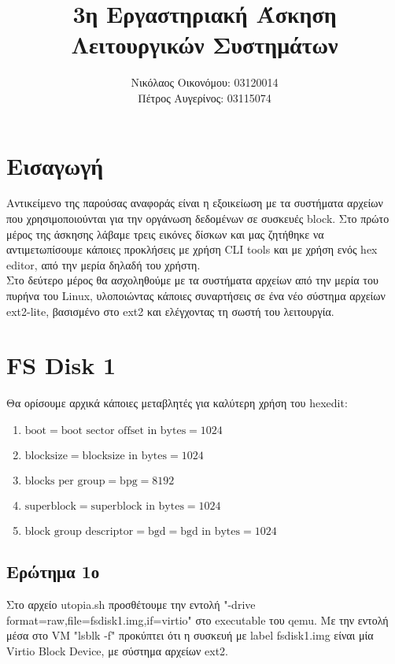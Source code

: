 \documentclass{article}
\title{3η Εργαστηριακή Άσκηση Λειτουργικών Συστημάτων}
\author{Νικόλαος Οικονόμου: 03120014 \\
        Πέτρος Αυγερίνος: 03115074}
\date{}
\begin{document}
\maketitle
\pagebreak
\section{Εισαγωγή} 
Αντικείμενο της παρούσας αναφοράς είναι η εξοικείωση με τα συστήματα αρχείων που χρησιμοποιούνται για 
την οργάνωση δεδομένων σε συσκευές block. Στο πρώτο μέρος της άσκησης λάβαμε τρεις εικόνες δίσκων και
μας ζητήθηκε να αντιμετωπίσουμε κάποιες προκλήσεις με χρήση CLI tools και με χρήση ενός hex editor, από
την μερία δηλαδή του χρήστη.\\

Στο δεύτερο μέρος θα ασχοληθούμε με τα συστήματα αρχείων από την μερία του πυρήνα του Linux, υλοποιώντας
κάποιες συναρτήσεις σε ένα νέο σύστημα αρχείων ext2-lite, βασισμένο στο ext2 και ελέγχοντας τη σωστή του
λειτουργία.\\

\section{FS Disk 1}
Θα ορίσουμε αρχικά κάποιες μεταβλητές για καλύτερη χρήση του hexedit:\\
\begin{enumerate}
    \item{$\text{boot} = \text{boot sector offset in bytes} = 1024$}
    \item{$\text{blocksize} = \text{blocksize in bytes} = 1024$}
    \item{$\text{blocks per group} = \text{bpg} = 8192$}
    \item{$\text{superblock} = \text{superblock in bytes} = 1024$}
    \item{$\text{block group descriptor} =\text{bgd} = \text{bgd in bytes} = 1024$}

\end{enumerate}

\subsection{Ερώτημα 1ο}
Στο αρχείο utopia.sh προσθέτουμε την εντολή "-drive format=raw,file=fsdisk1.img,if=virtio"
στο executable του qemu. Με την εντολή μέσα στο VM "lsblk -f" προκύπτει ότι η συσκευή με label fsdisk1.img
είναι μία Virtio Block Device, με σύστημα αρχείων ext2.\\
\end{document}
